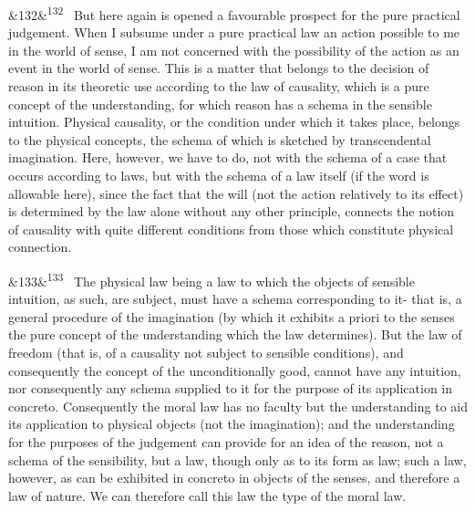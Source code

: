 \documentclass[12pt]{article}
\newcommand{\para}[1][]{\par\noindent\ifx&#1&\else\textsuperscript{\footnotesize #1}~\fi}
\begin{document}
\para[132] But here again is opened a favourable prospect for the pure practical judgement. When I subsume under a pure practical law an action possible to me in the world of sense, I am not concerned with the possibility of the action as an event in the world of sense. This is a matter that belongs to the decision of reason in its theoretic use according to the law of causality, which is a pure concept of the understanding, for which reason has a schema in the sensible intuition. Physical causality, or the condition under which it takes place, belongs to the physical concepts, the schema of which is sketched by transcendental imagination. Here, however, we have to do, not with the schema of a case that occurs according to laws, but with the schema of a law itself (if the word is allowable here), since the fact that the will (not the action relatively to its effect) is determined by the law alone without any other principle, connects the notion of causality with quite different conditions from those which constitute physical connection.

\para[133] The physical law being a law to which the objects of sensible intuition, as such, are subject, must have a schema corresponding to it- that is, a general procedure of the imagination (by which it exhibits a priori to the senses the pure concept of the understanding which the law determines). But the law of freedom (that is, of a causality not subject to sensible conditions), and consequently the concept of the unconditionally good, cannot have any intuition, nor consequently any schema supplied to it for the purpose of its application in concreto. Consequently the moral law has no faculty but the understanding to aid its application to physical objects (not the imagination); and the understanding for the purposes of the judgement can provide for an idea of the reason, not a schema of the sensibility, but a law, though only as to its form as law; such a law, however, as can be exhibited in concreto in objects of the senses, and therefore a law of nature. We can therefore call this law the type of the moral law.
\end{document}
